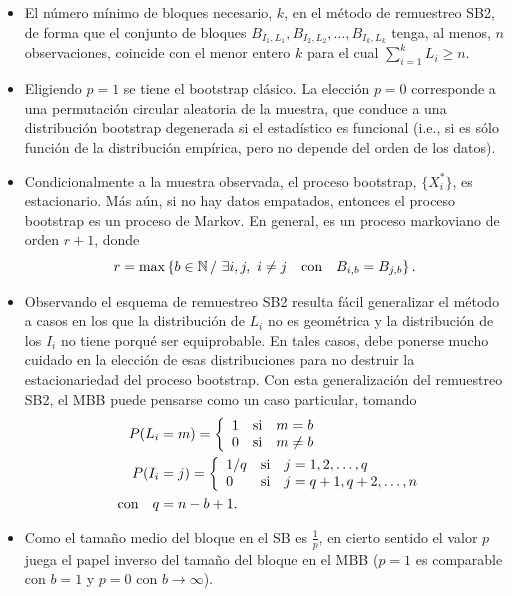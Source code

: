 \documentclass[
]{book}
\theoremstyle{break}
\theoremstyle{nonumberplain}
\begin{document}
\begin{itemize}
\item
  El número mínimo de bloques necesario, \(k\), en el método de
  remuestreo SB2, de forma que el conjunto de bloques
  \(B_{I_1,L_1},B_{I_2,L_2},\ldots ,B_{I_{k},L_{k}}\) tenga, al
  menos, \(n\) observaciones, coincide con el menor entero \(k\) para el
  cual \(\sum_{i=1}^{k}L_i\geq n\).
\item
  Eligiendo \(p=1\) se tiene el bootstrap clásico. La elección
  \(p=0\) corresponde a una permutación circular aleatoria de la
  muestra, que conduce a una distribución bootstrap degenerada si el
  estadístico es funcional (i.e., si es sólo función de la
  distribución empírica, pero no depende del orden de los datos).
\item
  Condicionalmente a la muestra observada, el proceso bootstrap,
  \(\{X_i^{\ast}\}\), es estacionario. Más aún, si no hay datos
  empatados, entonces el proceso bootstrap es un proceso de Markov. En
  general, es un proceso markoviano de orden \(r+1\), donde
  \[r=\max \left\{ b\in \mathbb{N}\,/\,\,\exists i,j,\,\,i\neq j\quad \hbox{con}
  \quad B_{i,b}=B_{j,b}\right\} .\]
\item
  Observando el esquema de remuestreo SB2 resulta fácil generalizar el
  método a casos en los que la distribución de \(L_i\) no es
  geométrica y la distribución de los \(I_i\) no tiene porqué ser
  equiprobable. En tales casos, debe ponerse mucho cuidado en la
  elección de esas distribuciones para no destruir la estacionariedad
  del proceso bootstrap. Con esta generalización del remuestreo SB2,
  el MBB puede pensarse como un caso particular, tomando
  \[\begin{aligned}
  P(L_i &= m)=\left\{ 
  \begin{array}{lll}
  1 & \mathrm{si} & m=b \\ 
  0 & \mathrm{si} & m\neq b
  \end{array}
     \right. \\
  P(I_i &= j)=\left\{ 
  \begin{array}{lll}
  1/q & \mathrm{si} & j=1,2,\ldots ,q \\ 
  0 & \mathrm{si} & j=q+1,q+2,\ldots ,n
  \end{array}
     \right. \\
  \quad \hbox{con}\quad q&= n-b+1.\end{aligned}\]
\item
  Como el tamaño medio del bloque en el SB es \(\frac{1}{p}\), en cierto
  sentido el valor \(p\) juega el papel inverso del tamaño del bloque en
  el MBB (\(p=1\) es comparable con \(b=1\) y \(p=0\) con
  \(b\rightarrow \infty\)).
\end{itemize}
\end{document}
